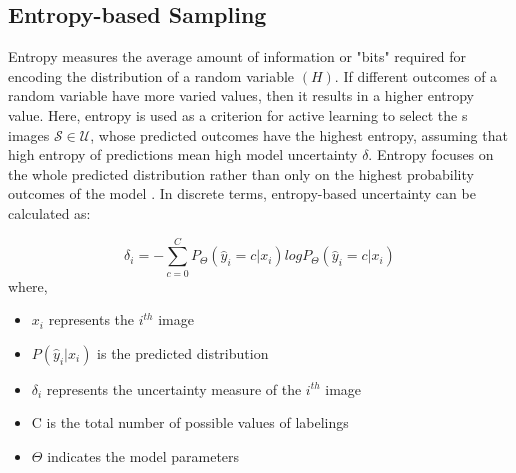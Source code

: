 \subsection{Entropy-based Sampling}
Entropy measures the average amount of information or "bits" required for encoding the distribution of a random variable \cite{shannon1948} $(H)$. If different outcomes of a random variable have more varied values, then it results in a higher entropy value. Here, entropy is used as a criterion for active learning \cite{settles2009} to select the s images $\mathcal{S} \in \mathcal{U}$, whose predicted outcomes have the highest entropy, assuming that high entropy of predictions mean high model uncertainty $\delta$. Entropy focuses on the whole predicted distribution rather than only on the highest probability outcomes of the model \cite{settles2009}. In discrete terms, entropy-based uncertainty can be calculated as:

\begin{equation}
    \label{equation:entropy_sampling}
    \delta_{i} = - \sum_{c=0}^{C} P_{\Theta}(\hat{y}_i = c|x_i)logP_{\Theta}(\hat{y}_i = c|x_i)
\end{equation}
where,
\begin{itemize}[label={}]
  \setlength\itemsep{0em}
  \item $x_i$ represents the $i^{th}$ image
  \item $P(\hat{y}_i|x_i)$ is the predicted distribution
  \item $\delta_{i}$ represents the uncertainty measure of the $i^{th}$ image
  \item C is the total number of possible values of labelings
  \item $\Theta$ indicates the model parameters
\end{itemize}

